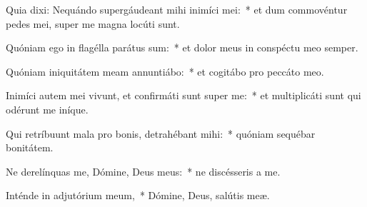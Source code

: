 \item Quia dixi: Nequándo supergáudeant mihi inimíci mei:~* et dum commovéntur pedes mei, super me magna locúti sunt.

\item Quóniam ego in flagélla parátus sum:~* et dolor meus in conspéctu meo semper.

\item Quóniam iniquitátem meam annuntiábo:~* et cogitábo pro peccáto meo.

\item Inimíci autem mei vivunt, et confirmáti sunt super me:~* et multiplicáti sunt qui odérunt me iníque.

\item Qui retríbuunt mala pro bonis, detrahébant mihi:~* quóniam sequébar bonitátem.

\item Ne derelínquas me, Dómine, Deus meus:~* ne discésseris a me.

\item Inténde in adjutórium meum,~* Dómine, Deus, salútis meæ.

